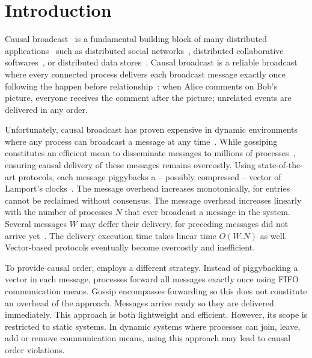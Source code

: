 
\section{Introduction}

Causal broadcast~\cite{hadzilacos1994modular} is a fundamental building block of
many distributed applications~\cite{nakamoto2009bitcoin} such as distributed
social networks~\cite{borthakur2013petabyte}, distributed collaborative
softwares~\cite{nedelec2016crate,heinrich2012exploiting}, or distributed data
stores~\cite{demers1987epidemic,shapiro2011comprehensive,bailis2013bolton,lloyd2011cops,bravo2017saturn}.
Causal broadcast is a reliable broadcast where every connected process
delivers each broadcast message exactly once following the happen
before relationship~\cite{lamport1978time,schwarz1994detecting}: when
Alice comments on Bob's picture, everyone receives the comment after the
picture; unrelated events are delivered in any order.

Unfortunately, causal broadcast has proven expensive in dynamic environments
where any process can broadcast a message at any
time~\cite{charronbost1991concerning}. While gossiping constitutes an efficient
mean to disseminate messages to millions of
processes~\cite{demers1987epidemic,birman1999bimodal}, ensuring causal
delivery of these messages remains overcostly.  Using state-of-the-art
protocols, each message piggybacks a -- possibly compressed -- vector of
Lamport's
clocks~\cite{almeida2008interval,fidge1988timestamps,mattern1989virtual,singhal1992efficient}.
The message overhead increases monotonically, for entries cannot be reclaimed
without consensus. The message overhead increases linearly with the number of
processes $N$ that ever broadcast a message in the system. Several messages $W$
may deffer their delivery, for preceding messages did not arrive
yet~\cite{mehdi2017slowdown}.  The delivery execution time takes linear time
$O(W.N)$ as well.
Vector-based protocols eventually become overcostly and inefficient.


To provide causal order, \cite{friedman2004causal} employs a different
strategy. Instead of piggybacking a vector in each message, processes forward
all messages exactly once using FIFO communication means. Gossip encompasses
forwarding so this does not constitute an overhead of the approach.  Messages
arrive ready so they are delivered immediately. This approach is both
lightweight and efficient. However, its scope is restricted to static systems.
In dynamic systems where processes can join, leave, add or remove communication
means, using this approach may lead to causal order violations.


